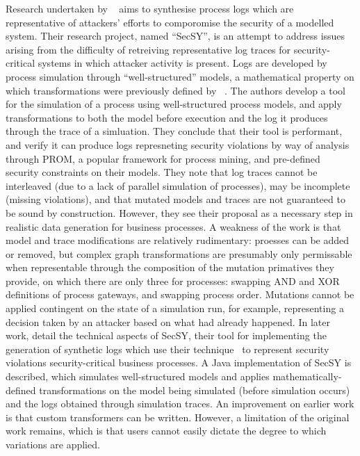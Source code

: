 Research undertaken by \citeauthor{stocker2013secsy}~\cite{stocker2013secsy}
aims to synthesise process logs which are representative of attackers' efforts
to comporomise the security of a modelled system. Their research project, named
``SecSY'', is an attempt to address issues arising from the difficulty of
retreiving representative log traces for security-critical systems in which
attacker activity is present. Logs are developed by process simulation through
``well-structured'' models, a mathematical property on which transformations
were previously defined by
\citeauthor{vanhatalo2009refined}~\cite{vanhatalo2009refined}. The authors
develop a tool for the simulation of a process using well-structured process
models, and apply transformations to both the model before execution and the log
it produces through the trace of a simluation. They conclude that their tool is
performant, and verify it can produce logs represneting security violations by
way of analysis through PROM, a popular framework for process mining, and
pre-defined security constraints on their models. They note that log traces
cannot be interleaved (due to a lack of parallel simulation of processes), may
be incomplete (missing violations), and that mutated models and traces are not
guaranteed to be sound by construction. However, they see their proposal as a
necessary step in realistic data generation for business processes. A weakness
of the work is that model and trace modifications are relatively rudimentary:
proesses can be added or removed, but complex graph transformations are
presumably only permissable when representable through the composition of the
mutation primatives they provide, on which there are only three for processes:
swapping AND and XOR definitions of process gateways, and swapping process
order. Mutations cannot be applied contingent on the state of a simulation run,
for example, representing a decision taken by an attacker based on what had
already happened. In later work, \citeauthor{stocker2014secsy} detail the
technical aspects of SecSY, their tool for implementing the generation of
synthetic logs which use their technique~\cite{stocker2013secsy} to represent
security violations security-critical business processes. A Java implementation
of SecSY is described, which simulates well-structured models and applies
mathematically-defined transformations on the model being simulated (before
simulation occurs) and the logs obtained through simulation traces. An
improvement on earlier work is that custom transformers can be written. However,
a limitation of the original work remains, which is that users cannot easily
dictate the degree to which variations are applied.


